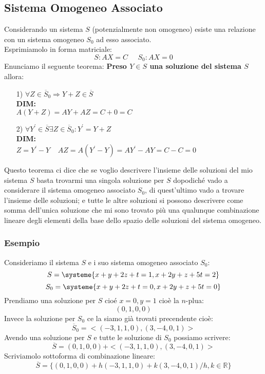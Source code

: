 \subsection{Sistema Omogeneo Associato}
Considerando un sistema $S$ (potenzialmente non omogeneo) esiste una relazione con un sistema omogeneo $S_0$ ad esso associato.\\
Esprimiamolo in forma matriciale:
$$ S: AX=C \;\;\;\;\; S_0: AX=0 $$
Enunciamo il seguente teorema: \textbf{Preso $Y \in S$ una soluzione del sistema $S$} allora:
\begin{itemize}
\item[1)] $\forall Z \in \overline{S}_0 \Rightarrow Y+Z \in \overline{S} $\\ \textbf{DIM:}\\
$A(Y+Z)= AY + AZ = C+0 = C$
\item[2)] $\forall Y^{\prime} \in \overline{S} \exists Z \in \overline{S}_0: Y^{\prime}=Y+Z$\\
\textbf{DIM:}\\
$Z=Y^{\prime}-Y \;\;\;\; AZ=A(Y^{\prime}-Y) = AY^{\prime}-AY = C-C = 0$
\end{itemize}

Questo teorema ci dice che se voglio descrivere l’insieme delle soluzioni del mio sistema $S$ basta trovarmi una singola soluzione per $S$ dopodiché vado a considerare il sistema omogeneo associato $S_0$, di quest’ultimo vado a trovare l’insieme delle soluzioni; e tutte le altre soluzioni si possono descrivere come somma dell’unica soluzione che mi sono trovato più una qualunque combinazione lineare degli elementi della base dello spazio delle soluzioni del sistema omogeneo.

\subsubsection{Esempio}
Consideriamo il sistema $S$ e i suo sistema omogeneo associato $S_0$:
$$
S=
\systeme
{
x+y+2z+t=1,
x+2y+z+5t=2
}
$$
$$
S_0=
\systeme
{
x+y+2z+t=0,
x+2y+z+5t=0
}
$$
Prendiamo una soluzione per $S$ cioé $x=0,y=1$ cioè la $n$-plua:
$$ (0,1,0,0) $$
Invece la soluzione per $S_0$ ce la siamo già trovati precendente cioè:
$$ \overline{S}_0 = <(-3,1,1,0),(3,-4,0,1)> $$
Avendo una soluzione per $S$ e tutte le soluzione di $S_0$ possiamo scrivere:
$$ \overline{S} = (0,1,0,0) + <(-3,1,1,0),(3,-4,0,1)> $$
Scriviamolo sottoforma di combinazione lineare:
$$ \overline{S} = \{(0,1,0,0) + h(-3,1,1,0)+k(3,-4,0,1)/h,k \in \mathbb{R}\} $$






